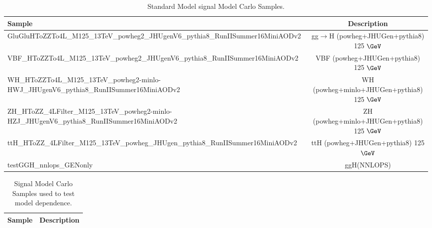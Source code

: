 \documentclass{article}
\begin{document}
\begin{table}[!h!tb]
\begin{center}
\small
\caption{
Standard Model signal Model Carlo Samples.
\label{tab:samplesSM}
}
\begin{tabular}{|l|c|} \hline 
Sample & Description \\ \hline 
GluGluHToZZTo4L\_M125\_13TeV\_powheg2\_JHUgenV6\_pythia8\_RunIISummer16MiniAODv2 & gg$\rightarrow$H ({\sc powheg+JHUGen+pythia8}) 125 $\GeV$ \\ 
 VBF\_HToZZTo4L\_M125\_13TeV\_powheg2\_JHUgenV6\_pythia8\_RunIISummer16MiniAODv2 & VBF ({\sc powheg+JHUGen+pythia8}) 125 $\GeV$ \\ 
 WH\_HToZZTo4L\_M125\_13TeV\_powheg2-minlo-HWJ\_JHUgenV6\_pythia8\_RunIISummer16MiniAODv2 & WH ({\sc powheg+minlo+JHUGen+pythia8}) 125 $\GeV$ \\ 
 ZH\_HToZZ\_4LFilter\_M125\_13TeV\_powheg2-minlo-HZJ\_JHUgenV6\_pythia8\_RunIISummer16MiniAODv2 & ZH ({\sc powheg+minlo+JHUGen+pythia8}) 125 $\GeV$ \\ 
 ttH\_HToZZ\_4LFilter\_M125\_13TeV\_powheg\_JHUgen\_pythia8\_RunIISummer16MiniAODv2 & ttH ({\sc powheg+JHUGen+pythia8}) 125 $\GeV$ \\ 
 testGGH\_nnlops\_GENonly & ggH(NNLOPS) \\ 
 
\hline
\end{tabular}
\normalsize
\end{center}
\end{table}
 
 
 
\begin{table}[!h!tb]
\begin{center}
\small
\caption{
Signal Model Carlo Samples used to test model dependence.
\label{tab:samplesExo}
}
\begin{tabular}{|l|c|} \hline 
Sample & Description \\ \hline 

\hline
\end{tabular}
\normalsize
\end{center}
\end{table}
 
 
 
\end{document}
